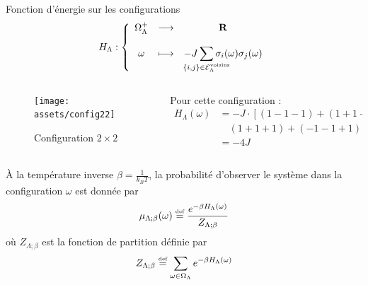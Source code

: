 \documentclass[french]{beamer}
\newcommand\eqdef{\overset{\mbox{\tiny def}}{=}}
\begin{document}
\begin{frame}
	\begin{definition}
		Fonction d'énergie sur les configurations
		\begin{align*}
		H_\Lambda :
		\left\{
		\begin{array}{ccc}
		\Omega_\Lambda^+ & \longrightarrow & \mathbf{R} \\
		\\
		\omega                   & \longmapsto       &  \displaystyle - J \sum_{\mathclap{\left\{i,j\right\} \in \mathcal{E}_\Lambda^\text{voisins}}} \sigma_i(\omega) \sigma_j(\omega)
		\end{array}
		\right.
		\end{align*}
	\end{definition}

\begin{columns}[onlytextwidth]
	\begin{column}{0.4\textwidth}
		\begin{figure}
			\centering
			\texttt{[image: assets/config22]}
			\caption{Configuration $2\times2$}
			\label{fig:config22}
		\end{figure}
	\end{column}
	\begin{column}{0.6\textwidth}
		Pour cette configuration :
		\begin{align*}
			H_\Lambda(\omega) &=-J \cdot \left[(1 -1 -1) + (1 +1 +1) +\right. \\ 
							 &\left.\quad(1 + 1 + 1) + (-1 -1 + 1) \right] \\
							&= -4J
		\end{align*}
	\end{column}
\end{columns}
\end{frame}

\begin{frame}
    \begin{definition}
    \`A la température inverse $\beta = \frac{1}{k_BT}$, la probabilité d'observer le système dans la configuration \(\omega\)  est donnée par
        \[\mu_{\Lambda;\beta}(\omega) \eqdef \frac{e^ { - \beta H_\Lambda(\omega)}}{Z_{\Lambda;\beta}} \]
        où $Z_{\Lambda;\beta}$ est la fonction de partition définie par
        \[Z_{\Lambda;\beta} \eqdef  \sum_{\omega \in \Omega_\Lambda} e^{-\beta H_\Lambda(\omega)}\]
    \end{definition}
\end{frame}
\end{document}

